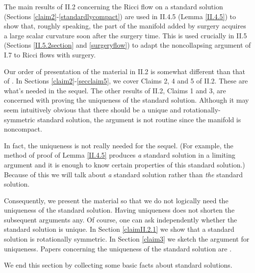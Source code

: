 The main results of II.2 concerning the Ricci flow on a standard solution
(Sections \ref{claim2}-\ref{standardlycompact}) are used in
II.4.5 (Lemma \ref{II.4.5}) to show that,
roughly speaking, the part of the manifold added by surgery
acquires a large scalar curvature soon after the surgery time.  This
is used crucially in II.5 (Sections \ref{II.5.2section} and \ref{surgeryflow})
to adapt the noncollapsing argument of I.7 to Ricci flows
with surgery.

Our order of presentation of the material in
II.2 is somewhat different than that of \cite{Perelman2}.
In Sections \ref{claim2}-\ref{secclaim5}, we
cover Claims 2, 4 and 5 of II.2. These are what's needed in the
sequel.  The other results of II.2, Claims 1 and 3, are concerned with proving the
uniqueness of the standard solution. Although it may seem
intuitively obvious that there should be a unique and
rotationally-symmetric standard solution, the argument
is not routine since the manifold is noncompact.

In fact, the uniqueness
is not really needed for the sequel. (For example, the method of proof of
Lemma \ref{II.4.5} produces {\em a} standard solution in a
limiting argument and it is enough to know certain properties
of this standard solution.) Because of this we will talk
about {\em a} standard solution rather than {\em the}
standard solution.

Consequently, we present the material so that we do not logically
need the uniqueness of the standard solution.
Having uniqueness does not
shorten the subsequent arguments any.
Of course, one can ask independently whether the standard
solution is unique. In Section \ref{claimII.2.1} we
show that a standard solution is rotationally symmetric.
In Section \ref{claim3} we sketch the argument for uniqueness.
Papers concerning the uniqueness of the standard solution are
\cite{Chen-Zhu,Lu-Tian}.

We end this section by collecting some basic facts about standard solutions.

